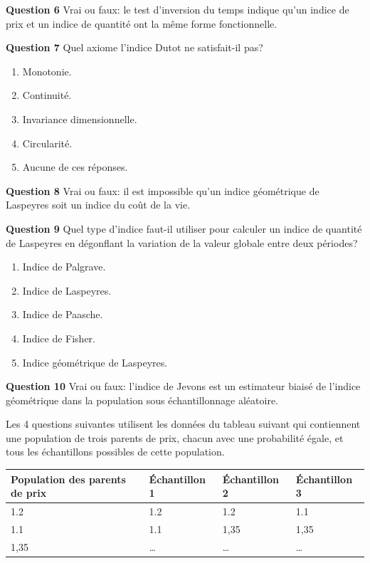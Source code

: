 \documentclass[]{article}
\begin{document}
\textbf{Question 6} Vrai ou faux: le test d'inversion du temps indique qu'un indice de prix et un indice de quantité ont la même forme fonctionnelle.

\textbf{Question 7} Quel axiome l'indice Dutot ne satisfait-il pas?

\begin{enumerate}
\def\labelenumi{\alph{enumi})}
\item
  Monotonie.
\item
  Continuité.
\item
  Invariance dimensionnelle.
\item
  Circularité.
\item
  Aucune de ces réponses.
\end{enumerate}

\textbf{Question 8} Vrai ou faux: il est impossible qu'un indice géométrique de Laspeyres soit un indice du coût de la vie.

\textbf{Question 9} Quel type d'indice faut-il utiliser pour calculer un indice de quantité de Laspeyres en dégonflant la variation de la valeur globale entre deux périodes?

\begin{enumerate}
\def\labelenumi{\alph{enumi})}
\item
  Indice de Palgrave.
\item
  Indice de Laspeyres.
\item
  Indice de Paasche.
\item
  Indice de Fisher.
\item
  Indice géométrique de Laspeyres.
\end{enumerate}

\textbf{Question 10} Vrai ou faux: l'indice de Jevons est un estimateur biaisé de l'indice géométrique dans la population sous échantillonnage aléatoire.

Les 4 questions suivantes utilisent les données du tableau suivant qui contiennent une population de trois parents de prix, chacun avec une probabilité égale, et tous les échantillons possibles de cette population.

\begin{longtable}[]{@{}llll@{}}
\toprule
Population des parents de prix & Échantillon 1 & Échantillon 2 & Échantillon 3\tabularnewline
\midrule
\endhead
1.2 & 1.2 & 1.2 & 1.1\tabularnewline
1.1 & 1.1 & 1,35 & 1,35\tabularnewline
1,35 & \ldots{} & \ldots{} & \ldots{}\tabularnewline
\bottomrule
\end{longtable}
\end{document}
